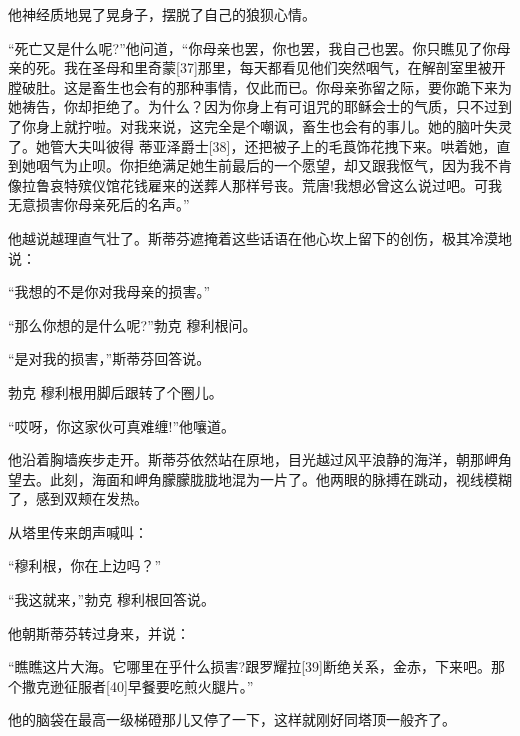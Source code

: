 \documentclass{article}
\begin{document}
他神经质地晃了晃身子，摆脱了自己的狼狈心情。



“死亡又是什么呢?”他问道，“你母亲也罢，你也罢，我自己也罢。你只瞧见了你母亲的死。我在圣母和里奇蒙[37]那里，每天都看见他们突然咽气，在解剖室里被开膛破肚。这是畜生也会有的那种事情，仅此而已。你母亲弥留之际，要你跪下来为她祷告，你却拒绝了。为什么？因为你身上有可诅咒的耶稣会士的气质，只不过到了你身上就拧啦。对我来说，这完全是个嘲讽，畜生也会有的事儿。她的脑叶失灵了。她管大夫叫彼得 \cdot 蒂亚泽爵士[38]，还把被子上的毛莨饰花拽下来。哄着她，直到她咽气为止呗。你拒绝满足她生前最后的一个愿望，却又跟我怄气，因为我不肯像拉鲁哀特殡仪馆花钱雇来的送葬人那样号丧。荒唐!我想必曾这么说过吧。可我无意损害你母亲死后的名声。”



他越说越理直气壮了。斯蒂芬遮掩着这些话语在他心坎上留下的创伤，极其冷漠地说：



“我想的不是你对我母亲的损害。”



“那么你想的是什么呢?”勃克 \cdot 穆利根问。



“是对我的损害，”斯蒂芬回答说。



勃克 \cdot 穆利根用脚后跟转了个圈儿。



“哎呀，你这家伙可真难缠!”他嚷道。



他沿着胸墙疾步走开。斯蒂芬依然站在原地，目光越过风平浪静的海洋，朝那岬角望去。此刻，海面和岬角朦朦胧胧地混为一片了。他两眼的脉搏在跳动，视线模糊了，感到双颊在发热。



从塔里传来朗声喊叫：



“穆利根，你在上边吗？”



“我这就来，”勃克 \cdot 穆利根回答说。



他朝斯蒂芬转过身来，并说：



“瞧瞧这片大海。它哪里在乎什么损害?跟罗耀拉[39]断绝关系，金赤，下来吧。那个撒克逊征服者[40]早餐要吃煎火腿片。”



他的脑袋在最高一级梯磴那儿又停了一下，这样就刚好同塔顶一般齐了。
\end{document}
